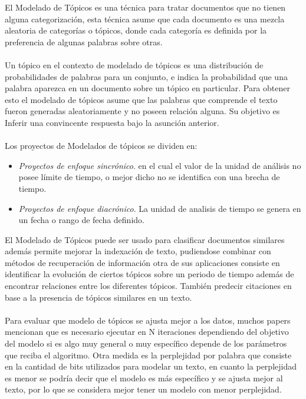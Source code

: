 \documentclass[8.5pt,twoside,twocolumn]{article}
\begin{document}
El Modelado de T\'opicos es una t\'ecnica para tratar documentos que no tienen alguna categorizaci\'on, esta t\'ecnica asume que cada documento es una mezcla aleatoria de categor\'ias o t\'opicos, donde cada categor\'ia es definida por la preferencia de algunas palabras sobre otras.
\\
\\
Un t\'opico en el contexto de modelado de t\'opicos es una distribuci\'on
de probabilidades de palabras para un conjunto, e indica la probabilidad
que una palabra aparezca en un documento  sobre un t\'opico en particular. Para obtener esto el modelado de t\'opicos asume que las palabras que comprende el texto fueron generadas aleatoriamente y no poseen relaci\'on alguna. Su objetivo es Inferir una convincente respuesta bajo la asunci\'on anterior.  
\\
\\
Los proyectos de Modelados de t\'opicos se dividen en:
\begin{itemize}
\item \emph{Proyectos de enfoque sincr\'onico}. 
          en el cual el valor de la unidad de an\'alisis no 
          posee l\'imite de tiempo, o mejor dicho no se 
          identifica con una brecha de tiempo.

\item \emph{Proyectos de enfoque diacr\'onico}. 
          La unidad de analisis de tiempo se genera 
          en un fecha o rango de fecha definido.
\end{itemize}
El Modelado de T\'opicos puede ser usado para clasificar documentos similares 
adem\'as permite mejorar la indexaci\'on de texto, pudiendose combinar con m\'etodos de 
recuperaci\'on de informaci\'on otra de sus aplicaciones consiste en identificar la evoluci\'on de ciertos t\'opicos sobre
un periodo de tiempo adem\'as de encontrar relaciones entre los diferentes t\'opicos.
Tambi\'en predecir citaciones en base a la presencia de t\'opicos similares en un texto.
\\ 
\\
Para evaluar que modelo de t\'opicos se ajusta mejor a los datos, muchos papers mencionan que es necesario 
ejecutar en N iteraciones dependiendo del objetivo del modelo si es algo muy general o muy espec\'ifico depende
de los par\'ametros que reciba el algoritmo. Otra medida  es la perplejidad por palabra que consiste
en la cantidad de bits utilizados para modelar un texto, en cuanto la perplejidad es menor se podr\'ia decir que
el modelo es m\'as espec\'ifico y se ajusta mejor al texto, por lo que se considera mejor 
tener un modelo con menor perplejidad.
\end{document}
